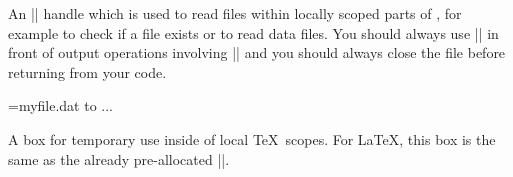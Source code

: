 \begin{internallist}{\r@pgf@reada}
	An |\openin| handle which is used to read files within locally scoped parts of \pgfname, for example to check if a file exists or to read data files. You should always use |\immediate| in front of output operations involving |\w@pgf@writea| and you should always close the file before returning from your code.
\begin{codeexample}
\immediate\openin\r@pgf@reada=myfile.dat
\ifeof\r@pgf@reada
\else
    \immediate\read\r@pgf@reada to\macro
    ...
\fi
\immediate\closein\r@pgf@reada
\end{codeexample}
\end{internallist}

\begin{internallist}[box]{\pgfutil@tempboxa}
	A box for temporary use inside of local \TeX\ scopes. For \LaTeX, this box is the same as the already pre-allocated |\@tempboxa|.
\end{internallist}
